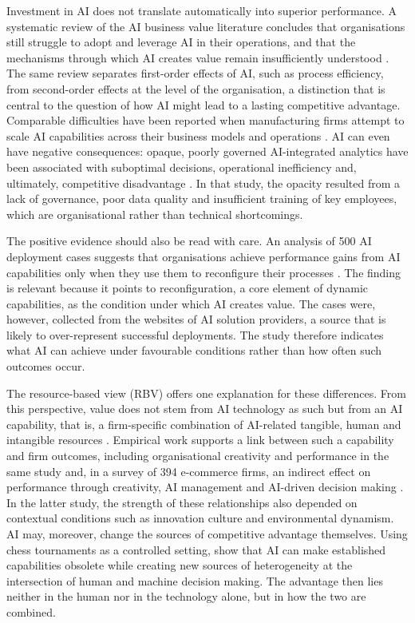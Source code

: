 Investment in AI does not translate automatically into superior performance. A systematic review of the AI business value literature concludes that organisations still struggle to adopt and leverage AI in their operations, and that the mechanisms through which AI creates value remain insufficiently understood \parencite{enholm2022}. The same review separates first-order effects of AI, such as process efficiency, from second-order effects at the level of the organisation, a distinction that is central to the question of how AI might lead to a lasting competitive advantage. Comparable difficulties have been reported when manufacturing firms attempt to scale AI capabilities across their business models and operations \parencite{sjodin2021}. AI can even have negative consequences: opaque, poorly governed AI-integrated analytics have been associated with suboptimal decisions, operational inefficiency and, ultimately, competitive disadvantage \parencite{rana2022}. In that study, the opacity resulted from a lack of governance, poor data quality and insufficient training of key employees, which are organisational rather than technical shortcomings.

The positive evidence should also be read with care. An analysis of 500 AI deployment cases suggests that organisations achieve performance gains from AI capabilities only when they use them to reconfigure their processes \parencite{wambataguimdje2020}. The finding is relevant because it points to reconfiguration, a core element of dynamic capabilities, as the condition under which AI creates value. The cases were, however, collected from the websites of AI solution providers, a source that is likely to over-represent successful deployments. The study therefore indicates what AI can achieve under favourable conditions rather than how often such outcomes occur.

The resource-based view (RBV) offers one explanation for these differences. From this perspective, value does not stem from AI technology as such but from an AI capability, that is, a firm-specific combination of AI-related tangible, human and intangible resources \parencite{mikalef2021ai}. Empirical work supports a link between such a capability and firm outcomes, including organisational creativity and performance in the same study and, in a survey of 394 e-commerce firms, an indirect effect on performance through creativity, AI management and AI-driven decision making \parencite{chen2022}. In the latter study, the strength of these relationships also depended on contextual conditions such as innovation culture and environmental dynamism. AI may, moreover, change the sources of competitive advantage themselves. Using chess tournaments as a controlled setting, \textcite{krakowski2023} show that AI can make established capabilities obsolete while creating new sources of heterogeneity at the intersection of human and machine decision making. The advantage then lies neither in the human nor in the technology alone, but in how the two are combined.


